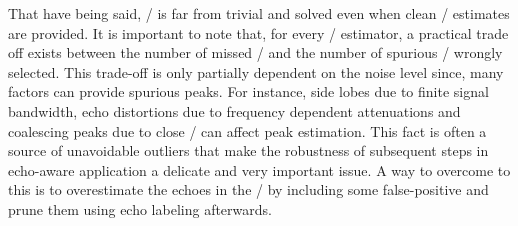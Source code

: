 \mynewline
That have being said, \AER/ is far from trivial and solved even when clean \RIR/ estimates are provided.
It is important to note that, for every \TOA/ estimator, a practical trade off exists between the number of missed \TOAs/ and the number of spurious \TOAs/ wrongly selected.
This trade-off is only partially dependent on the noise level since, many factors can provide spurious peaks.
For instance, side lobes due to finite signal bandwidth, echo distortions due to frequency dependent attenuations and coalescing peaks due to close \TOAs/ can affect peak estimation.
This fact is often a source of unavoidable outliers that make the robustness of subsequent steps in echo-aware application a delicate and very important issue.
A way to overcome to this is to overestimate the echoes in the \RIR/ by including some false-positive and prune them using echo labeling afterwards.

